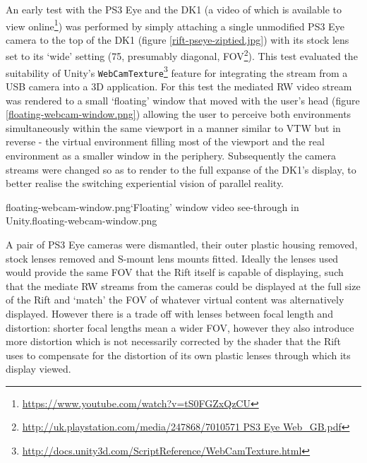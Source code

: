 An early test with the PS3 Eye and the DK1 (a video of which is available to view online\footnote{\url{https://www.youtube.com/watch?v=tS0FGZxQzCU}}) was performed by simply attaching a single unmodified PS3 Eye camera to the top of the DK1 (figure \ref{rift-pseye-ziptied.jpg}) with its stock lens set to its `wide' setting (75\textdegree, presumably diagonal, FOV\footnote{\url{http://uk.playstation.com/media/247868/7010571 PS3 Eye Web_GB.pdf}}). This test evaluated the suitability of Unity's \texttt{WebCamTexture}\footnote{\url{http://docs.unity3d.com/ScriptReference/WebCamTexture.html}} feature for integrating the stream from a USB camera into a 3D application. For this test the mediated RW video stream was rendered to a small `floating' window that moved with the user's head (figure \ref{floating-webcam-window.png}) allowing the user to perceive both environments simultaneously within the same viewport in a manner similar to VTW but in reverse - the virtual environment filling most of the viewport and the real environment as a smaller window in the periphery. Subsequently the camera streams were changed so as to render to the full expanse of the DK1's display, to better realise the switching experiential vision of parallel reality.

       {floating-webcam-window.png}{`Floating' window video see-through in Unity.}{floating-webcam-window.png}

A pair of PS3 Eye cameras were dismantled, their outer plastic housing removed, stock lenses removed and S-mount lens mounts fitted. Ideally the lenses used would provide the same FOV that the Rift itself is capable of displaying, such that the mediate RW streams from the cameras could be displayed at the full size of the Rift and `match' the FOV of whatever virtual content was alternatively displayed. However there is a trade off with lenses between focal length and distortion: shorter focal lengths mean a wider FOV, however they also introduce more distortion which is not necessarily corrected by the shader that the Rift uses to compensate for the distortion of its own plastic lenses through which its display viewed.

